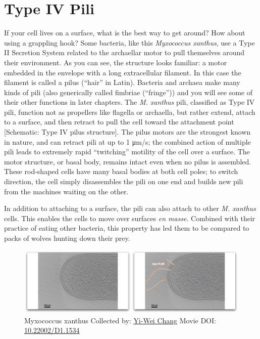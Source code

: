 \documentclass[]{tufte-book}
\begin{document}
\section{Type IV Pili}\label{type-iv-pili}

If your cell lives on a surface, what is the best way to get around? How
about using a grappling hook? Some bacteria, like this \emph{Myxococcus
xanthus}, use a Type II Secretion System related to the archaellar motor
to pull themselves around their environment. As you can see, the
structure looks familiar: a motor embedded in the envelope with a long
extracellular filament. In this case the filament is called a pilus
(``hair'' in Latin). Bacteria and archaea make many kinds of pili (also
generically called fimbriae (``fringe'')) and you will see some of their
other functions in later chapters. The \emph{M. xanthus} pili,
classified as Type IV pili, function not as propellers like flagella or
archaella, but rather extend, attach to a surface, and then retract to
pull the cell toward the attachment point {[}Schematic: Type IV pilus
structure{]}. The pilus motors are the strongest known in nature, and
can retract pili at up to 1 μm/s; the combined action of multiple pili
leads to extremely rapid ``twitching'' motility of the cell over a
surface. The motor structure, or basal body, remains intact even when no
pilus is assembled. These rod-shaped cells have many basal bodies at
both cell poles; to switch direction, the cell simply disassembles the
pili on one end and builds new pili from the machines waiting on the
other.

In addition to attaching to a surface, the pili can also attach to other
\emph{M. xanthus} cells. This enables the cells to move over surfaces
\emph{en masse}. Combined with their practice of eating other bacteria,
this property has led them to be compared to packs of wolves hunting
down their prey.





\begin{figure}
\includegraphics{movie_stills/6_10} \caption[Myxococcus xanthus Collected by:
\protect\hyperlink{yi-wei_chang}{Yi-Wei Chang} Movie DOI:
\href{https://doi.org/10.22002/D1.1534}{10.22002/D1.1534}]{Myxococcus xanthus Collected by:
\protect\hyperlink{yi-wei_chang}{Yi-Wei Chang} Movie DOI:
\href{https://doi.org/10.22002/D1.1534}{10.22002/D1.1534}}\label{fig:6-10}
\end{figure}
\end{document}
